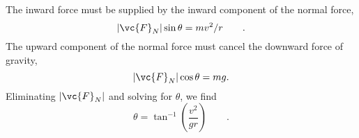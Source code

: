 The inward force must be supplied by the inward component
of the normal force,
\begin{equation*}
        |\vc{F}_N| \sin  \theta   =  mv ^2/ r   \qquad   .
\end{equation*}
The upward component of the normal force must cancel the
downward force of gravity,
\begin{equation*}
        |\vc{F}_N| \cos  \theta   =  mg  .
\end{equation*}
Eliminating $|\vc{F}_N|$ and solving for $\theta $, we find
\begin{equation*}
     \theta = \tan^{-1}\left(\frac{v^2}{gr}\right)  \qquad   .
\end{equation*}



